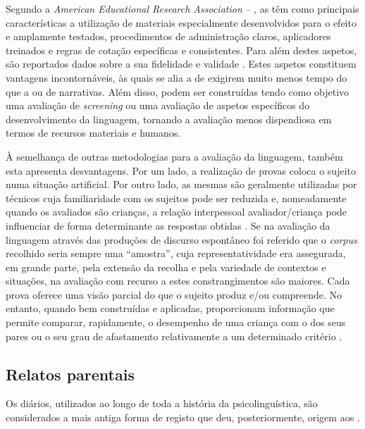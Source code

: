 \documentclass[output=paper]{LSP/langsci}
\begin{document}
Segundo a \textit{American Educational Research Association} – \citep{aera2014}, as  têm como principais características a utilização de materiais especialmente desenvolvidos para o efeito e amplamente testados, procedimentos de administração claros, aplicadores treinados e regras de cotação específicas e consistentes. Para além destes aspetos, são reportados dados sobre a sua fidelidade e validade \citep{paul2007}. Estes aspetos constituem vantagens incontornáveis, às quais se alia a de exigirem muito menos tempo do que a  ou de narrativas. Além disso, podem ser construídas tendo como objetivo uma avaliação de \textit{screening} ou uma avaliação de aspetos específicos do desenvolvimento da linguagem, tornando a avaliação menos dispendiosa em termos de recursos materiais e humanos. 

À semelhança de outras metodologias para a avaliação da linguagem, também esta apresenta desvantagens. Por um lado, a realização de provas coloca o sujeito numa situação artificial. Por outro lado, as mesmas são geralmente utilizadas por técnicos cuja familiaridade com os sujeitos pode ser reduzida e, nomeadamente quando os avaliados são crianças, a relação interpessoal avaliador/criança pode influenciar de forma determinante as respostas obtidas \citep{condouris_etal2003}. Se na avaliação da linguagem através das produções de discurso espontâneo foi referido que o \textit{corpus} recolhido seria sempre uma “amostra”, cuja representatividade era assegurada, em grande parte, pela extensão da recolha e pela variedade de contextos e situações, na avaliação com recurso a  estes constrangimentos são maiores. Cada prova oferece uma visão parcial do que o sujeito produz e/ou compreende. No entanto, quando bem construídas e aplicadas, proporcionam informação que permite comparar, rapidamente, o desempenho de uma criança com o dos seus pares \citep{condouris_etal2003,paul2007} ou o seu grau de afastamento relativamente a um determinado critério \citep{almeidaviana2010}.

\subsection{Relatos parentais}
\label{subsec:viana_relatos}

Os diários, utilizados ao longo de toda a história da psicolinguística, são considerados a mais antiga forma de registo que deu, posteriormente, origem aos  \citep{fenson_etal2007}. 
\end{document}
